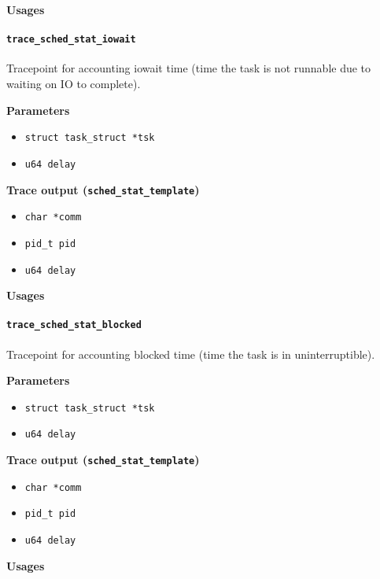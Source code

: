 \textbf{Usages}
\begin{code}

\end{code}


\paragraph{\texttt{trace\_sched\_stat\_iowait}}
Tracepoint for accounting iowait time (time the task is not runnable due to waiting on IO to complete).

\textbf{Parameters}
\begin{itemize}
    \item \verb|struct task_struct *tsk|
    \item \verb|u64 delay|
\end{itemize}

\textbf{Trace output (\texttt{sched\_stat\_template})}
\begin{itemize}
    \item \verb|char *comm|
    \item \verb|pid_t pid|
    \item \verb|u64 delay|
\end{itemize}

\textbf{Usages}
\begin{code}

\end{code}

\paragraph{\texttt{trace\_sched\_stat\_blocked}}
Tracepoint for accounting blocked time (time the task is in uninterruptible).

\textbf{Parameters}
\begin{itemize}
    \item \verb|struct task_struct *tsk|
    \item \verb|u64 delay|
\end{itemize}

\textbf{Trace output (\texttt{sched\_stat\_template})}
\begin{itemize}
    \item \verb|char *comm|
    \item \verb|pid_t pid|
    \item \verb|u64 delay|
\end{itemize}

\textbf{Usages}
\begin{code}

\end{code}


